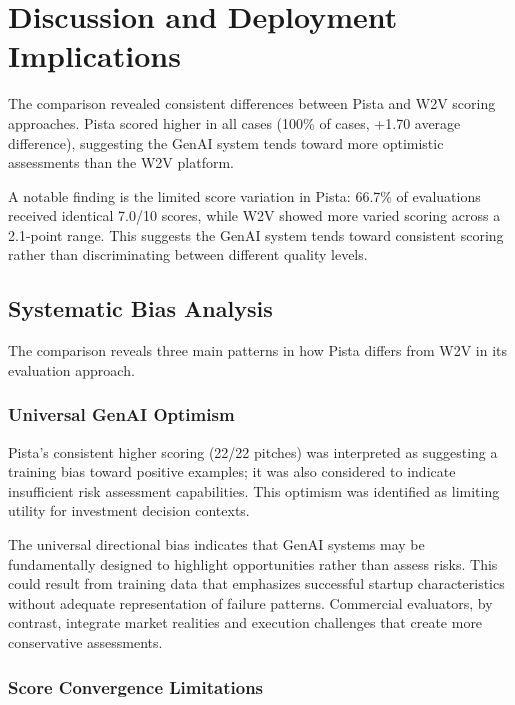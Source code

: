 \section{Discussion and Deployment Implications}

The comparison revealed consistent differences between Pista and W2V scoring approaches. Pista scored higher in all cases (100\% of cases, +1.70 average difference), suggesting the GenAI system tends toward more optimistic assessments than the W2V platform.

A notable finding is the limited score variation in Pista: 66.7\% of evaluations received identical 7.0/10 scores, while W2V showed more varied scoring across a 2.1-point range. This suggests the GenAI system tends toward consistent scoring rather than discriminating between different quality levels.

\subsection{Systematic Bias Analysis}
\label{sec:bias-analysis}

The comparison reveals three main patterns in how Pista differs from W2V in its evaluation approach.

\subsubsection{Universal GenAI Optimism}
\label{subsec:optimism}

Pista's consistent higher scoring (22/22 pitches) was interpreted as suggesting a training bias toward positive examples; it was also considered to indicate insufficient risk assessment capabilities. This optimism was identified as limiting utility for investment decision contexts.

The universal directional bias indicates that GenAI systems may be fundamentally designed to highlight opportunities rather than assess risks. This could result from training data that emphasizes successful startup characteristics without adequate representation of failure patterns. Commercial evaluators, by contrast, integrate market realities and execution challenges that create more conservative assessments.

\subsubsection{Score Convergence Limitations}
\label{subsec:convergence}

